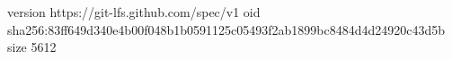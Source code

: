 version https://git-lfs.github.com/spec/v1
oid sha256:83ff649d340e4b00f048b1b0591125c05493f2ab1899bc8484d4d24920c43d5b
size 5612
